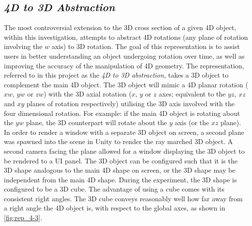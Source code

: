 \documentclass{l4proj}
\begin{document}
\subsection{\textit{4D to 3D Abstraction}}
The most controversial extension to the 3D cross section of a given 4D object, within this investigation, attempts to abstract 4D rotations (any plane of rotation involving the \(w\) axis) to 3D rotation. The goal of this representation is to assist users in better understanding an object undergoing rotation over time, as well as improving the accuracy of the manipulation of 4D geometry.
The representation, referred to in this project as the \textit{4D to 3D abstraction}, takes a 3D object to complement the main 4D object. The 3D object will mimic a 4D planar rotation ($xw$, $yw$ or $zw$) with the 3D axial rotation ($x$, $y$ or $z$ axes; equivalent to the $yz$, $xz$ and $xy$ planes of rotation respectively) utilising the 3D axis involved with the four dimensional rotation. For example: if the main 4D object is rotating about the $yw$ plane, the 3D counterpart will rotate about the $y$ axis (or the $xz$ plane).
In order to render a window with a separate 3D object on screen, a second plane was spawned into the scene in Unity to render the ray marched 3D object. A second camera facing the plane allowed for a window displaying the 3D object to be rendered to a UI panel.
The 3D object can be configured such that it is the 3D shape analogous to the main 4D shape on screen, or the 3D shape may be independent from the main 4D shape. During the experiment, the 3D shape is configured to be a 3D cube. 
The advantage of using a cube comes with its consistent right angles. The 3D cube conveys reasonably well how far away from a right angle the 4D object is, with respect to the global axes, as shown in \cref{fig:rep_4-3}.
\end{document}
